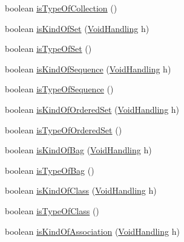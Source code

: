 \begin{DoxyCompactItemize}
\item 
boolean \hyperlink{classorg_1_1tzi_1_1use_1_1uml_1_1ocl_1_1type_1_1_type_impl_aa8114da8041400b4569575c1b59468b5}{is\-Type\-Of\-Collection} ()
\item 
boolean \hyperlink{classorg_1_1tzi_1_1use_1_1uml_1_1ocl_1_1type_1_1_type_impl_a3e528355ebf9e632339dd80d4a5a146b}{is\-Kind\-Of\-Set} (\hyperlink{enumorg_1_1tzi_1_1use_1_1uml_1_1ocl_1_1type_1_1_type_1_1_void_handling}{Void\-Handling} h)
\item 
boolean \hyperlink{classorg_1_1tzi_1_1use_1_1uml_1_1ocl_1_1type_1_1_type_impl_a88b7042f80e2ad8ca7246e064beae1d8}{is\-Type\-Of\-Set} ()
\item 
boolean \hyperlink{classorg_1_1tzi_1_1use_1_1uml_1_1ocl_1_1type_1_1_type_impl_a5a6526c66fb643cc8b942d07ab8b9a9c}{is\-Kind\-Of\-Sequence} (\hyperlink{enumorg_1_1tzi_1_1use_1_1uml_1_1ocl_1_1type_1_1_type_1_1_void_handling}{Void\-Handling} h)
\item 
boolean \hyperlink{classorg_1_1tzi_1_1use_1_1uml_1_1ocl_1_1type_1_1_type_impl_a4d27a7507838a87f7702f603c7877caf}{is\-Type\-Of\-Sequence} ()
\item 
boolean \hyperlink{classorg_1_1tzi_1_1use_1_1uml_1_1ocl_1_1type_1_1_type_impl_a31721a3acfe88258483af5074f063e88}{is\-Kind\-Of\-Ordered\-Set} (\hyperlink{enumorg_1_1tzi_1_1use_1_1uml_1_1ocl_1_1type_1_1_type_1_1_void_handling}{Void\-Handling} h)
\item 
boolean \hyperlink{classorg_1_1tzi_1_1use_1_1uml_1_1ocl_1_1type_1_1_type_impl_a387cb14356c4091f1548df322fe77f5a}{is\-Type\-Of\-Ordered\-Set} ()
\item 
boolean \hyperlink{classorg_1_1tzi_1_1use_1_1uml_1_1ocl_1_1type_1_1_type_impl_af565ba5573fddd04c77af18a9671c10a}{is\-Kind\-Of\-Bag} (\hyperlink{enumorg_1_1tzi_1_1use_1_1uml_1_1ocl_1_1type_1_1_type_1_1_void_handling}{Void\-Handling} h)
\item 
boolean \hyperlink{classorg_1_1tzi_1_1use_1_1uml_1_1ocl_1_1type_1_1_type_impl_a5c76bb645a2bd6842a4e2397b0205b2d}{is\-Type\-Of\-Bag} ()
\item 
boolean \hyperlink{classorg_1_1tzi_1_1use_1_1uml_1_1ocl_1_1type_1_1_type_impl_a8e36bdbd445c4a5d7bcb131f90ad6fb8}{is\-Kind\-Of\-Class} (\hyperlink{enumorg_1_1tzi_1_1use_1_1uml_1_1ocl_1_1type_1_1_type_1_1_void_handling}{Void\-Handling} h)
\item 
boolean \hyperlink{classorg_1_1tzi_1_1use_1_1uml_1_1ocl_1_1type_1_1_type_impl_a9b188da55e1ed8bd94b975d81d4bd2f4}{is\-Type\-Of\-Class} ()
\item 
boolean \hyperlink{classorg_1_1tzi_1_1use_1_1uml_1_1ocl_1_1type_1_1_type_impl_a5d3a9b96a86a2f86499c881e919f04a3}{is\-Kind\-Of\-Association} (\hyperlink{enumorg_1_1tzi_1_1use_1_1uml_1_1ocl_1_1type_1_1_type_1_1_void_handling}{Void\-Handling} h)

\end{DoxyCompactItemize}
